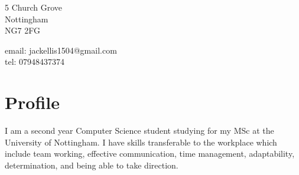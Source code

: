 \documentclass[12pt, a4paper]{article}
\begin{document}

\begin{minipage}[c]{.5\textwidth}
  \raggedright
  5 Church Grove\\
  Nottingham\\
  NG7 2FG
\end{minipage}
\begin{minipage}[c]{.5\textwidth}
  \raggedleft
  email: jackellis1504@gmail.com\\
  tel: 07948437374
\end{minipage}

\vspace{5mm}

\section*{Profile}
I am a second year Computer Science student studying for my MSc at the University of Nottingham.
I have skills transferable to the workplace which include team working, effective communication, time management, adaptability, determination, and being able to take direction.
\end{document}
